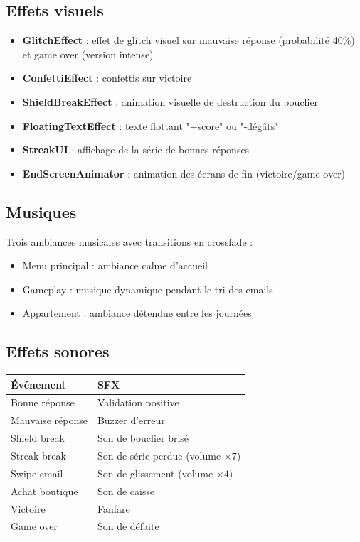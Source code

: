 \documentclass[12pt,a4paper]{article}
\begin{document}
\subsection{Effets visuels}
\begin{itemize}
    \item \textbf{GlitchEffect} : effet de glitch visuel sur mauvaise réponse (probabilité 40\%) et game over (version intense)
    \item \textbf{ConfettiEffect} : confettis sur victoire
    \item \textbf{ShieldBreakEffect} : animation visuelle de destruction du bouclier
    \item \textbf{FloatingTextEffect} : texte flottant "+score" ou "-dégâts"
    \item \textbf{StreakUI} : affichage de la série de bonnes réponses
    \item \textbf{EndScreenAnimator} : animation des écrans de fin (victoire/game over)
\end{itemize}

\subsection{Musiques}
Trois ambiances musicales avec transitions en crossfade :
\begin{itemize}
    \item Menu principal : ambiance calme d'accueil
    \item Gameplay : musique dynamique pendant le tri des emails
    \item Appartement : ambiance détendue entre les journées
\end{itemize}

\subsection{Effets sonores}
\begin{longtable}{|l|l|}
\hline
\textbf{Événement} & \textbf{SFX} \\
\hline
Bonne réponse & Validation positive \\
\hline
Mauvaise réponse & Buzzer d'erreur \\
\hline
Shield break & Son de bouclier brisé \\
\hline
Streak break & Son de série perdue (volume $\times 7$) \\
\hline
Swipe email & Son de glissement (volume $\times 4$) \\
\hline
Achat boutique & Son de caisse \\
\hline
Victoire & Fanfare \\
\hline
Game over & Son de défaite \\
\hline
\end{longtable}
\end{document}
